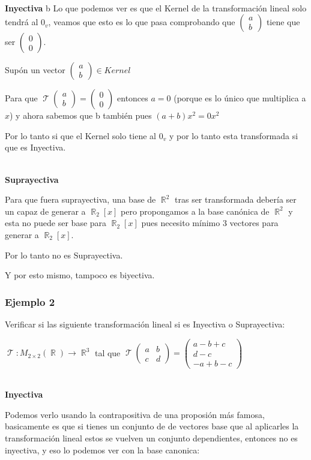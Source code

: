 \documentclass[12pt]{report}                                    %
\DeclareMathOperator \Real {\mathbb{R}}                         %
\DeclareMathOperator \LinealTransformation {\mathcal{T}}        %
\DeclareMathOperator \LT {\mathcal{T}}                          %
\newcommand{\pVector}[1]{                                       %
        \ensuremath{\begin{pmatrix}#1\end{pmatrix}}                 %
    }
\begin{document}
            \textbf{\\Inyectiva}
            b
            Lo que podemos ver es que el Kernel de la transformación lineal
            solo tendrá al $0_v$, veamos que esto es lo que pasa comprobando que $\pVector{a\\b}$
            tiene que ser $\pVector{0\\0}$.

            Supón un vector $\pVector{a\\b} \in Kernel$

            Para que $\LT\pVector{a\\b} = \pVector{0\\0}$ entonces $a=0$ (porque es lo 
            único que multiplica a $x$) y ahora sabemos que b también pues $(a+b)x^2=0x^2$

            Por lo tanto si que el Kernel solo tiene al $0_v$
            y por lo tanto esta transformada si que es Inyectiva.


            \textbf{\\Suprayectiva}

            Para que fuera suprayectiva, una base de $\Real^2$ tras ser transformada debería ser un capaz de
            generar a $\Real_2[x]$ pero propongamos a la base canónica de $\Real^2$ y esta no puede
            ser base para $\Real_2[x]$ pues necesito mínimo 3 vectores para generar a $\Real_2[x]$.

            Por lo tanto no es Suprayectiva.

            Y por esto mismo, tampoco es biyectiva.

            \clearpage
            \subsubsection{\large Ejemplo 2}
            Verificar si las siguiente transformación lineal si es Inyectiva o Suprayectiva:

            $\LinealTransformation : M_{2 \times 2}(\Real) \to \Real^3$ tal que 
            $\LT \pVector{a&b\\c&d} = \pVector{a-b+c\\d-c\\-a+b-c}$

            \textbf{\\Inyectiva}

            Podemos verlo usando la contrapositiva de una proposión más famosa, basicamente es que si
            tienes un conjunto de de vectores base que al aplicarles la transformación lineal estos se
            vuelven un conjunto dependientes, entonces no es inyectiva, y eso lo podemos ver con la base canonica:
\end{document}
